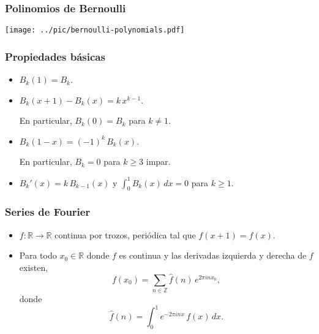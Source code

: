 \documentclass{beamer}
\begin{document}

\begin{frame}
  \frametitle{Polinomios de Bernoulli}

  \begin{center}
    \texttt{[image: ../pic/bernoulli-polynomials.pdf]}
  \end{center}
\end{frame}


\begin{frame}
  \frametitle{Propiedades básicas}

  \begin{itemize}
  \item<1-> $B_k (1) = B_k$.

  \item<2-> $B_k (x+1) - B_k (x) = k\,x^{k-1}$.

    En particular, $B_k (0) = B_k$ para $k \ne 1$.

  \item<3-> $B_k (1-x) = (-1)^k\,B_k (x)$.

    En particular, $B_k = 0$ para $k \ge 3$ impar.

  \item<4-> $B_k' (x) = k\,B_{k-1} (x)$ y $\int_0^1 B_k (x)\,dx = 0$ para $k \ge 1$.
  \end{itemize}
\end{frame}


\begin{frame}
  \frametitle{Series de Fourier}

  \begin{itemize}
    \item $f\colon \mathbb{R} \to \mathbb{R}$ continua por trozos,
      periódica tal que $f (x+1) = f (x)$.

    \item Para todo $x_0\in \mathbb{R}$ donde $f$ es continua y las derivadas
      izquierda y derecha de $f$ existen,
      $$f (x_0) = \sum_{n\in\mathbb{Z}} \widehat{f} (n) \, e^{2\pi i n x_0},$$
      donde
      $$\widehat{f} (n) = \int_0^1 e^{-2\pi i n x} \, f(x) \, dx.$$
  \end{itemize}
\end{frame}
\end{document}
